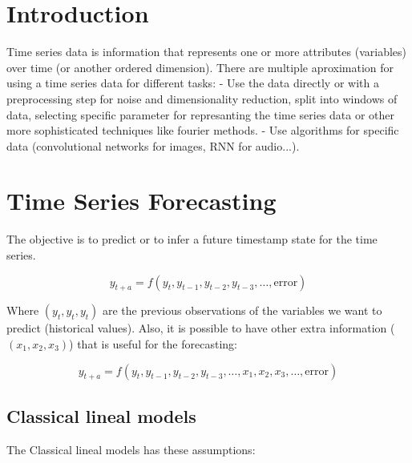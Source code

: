 
\newcommand{\estudiante}{García Justel, Alan}
\newcommand{\titulo}{MÁSTER EN INGENIERÍA COMPUTACIONAL Y SISTEMAS INTELIGENTES}
\newcommand{\asignatura}{INTRODUCTION TO TIME SERIES DATA}
\newcommand{\portada}{common/no_signal.png}
\newcommand{\colorportada}{title_green}
\newcommand{\curso}{2024-2025}



\newpage
\tableofcontents\thispagestyle{empty} \newpage

\section{Introduction}
Time series data is information that represents one or more attributes (variables) over time (or another ordered dimension).
There are multiple aproximation for using a time series data for different tasks:
- Use the data directly or with a preprocessing step for noise and dimensionality reduction, split into windows of data, selecting specific parameter for represanting the time series data or other more sophisticated techniques like fourier methods.
- Use algorithms for specific data (convolutional networks for images, RNN for audio...).

\section{Time Series Forecasting}
The objective is to predict or to infer a future timestamp state for the time series.

$$
y_{t + a} = f(y_t, y_{t-1}, y_{t-2}, y_{t-3}, \dots, \text{error})
$$

Where $(y_{t}, y_{t}, y_{t})$ are the previous observations of the variables we want to predict (historical values). 
Also, it is possible to have other extra information ($(x_{1}, x_{2}, x_{3})$) that is useful for the forecasting:

$$
y_{t + a} = f(y_t, y_{t-1}, y_{t-2}, y_{t-3}, \dots, x_{1}, x_{2}, x_{3}, \dots, \text{error})
$$

\subsection{Classical lineal models}
The Classical lineal models has these assumptions:

